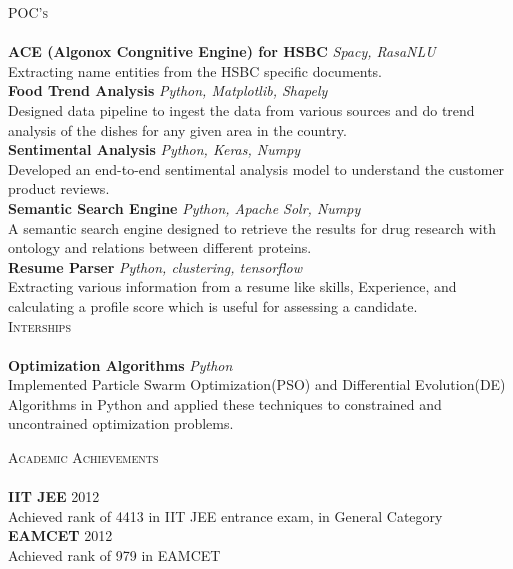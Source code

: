 \documentclass[a4paper]{article}
\newcommand{\lineunder} {
    \vspace*{-8pt} \\
    \hspace*{-18pt} \hrulefill \\
}
\newcommand{\header} [1] {
    {\hspace*{-18pt}\vspace*{6pt} \textsc{#1}}
    \vspace*{-6pt} \lineunder
}
\begin{document}
\header{POC's}
{\textbf{ACE (Algonox Congnitive Engine) for HSBC}} {\sl Spacy, RasaNLU} \\
Extracting name entities from the HSBC specific documents.\\
\vspace*{2mm}
{\textbf{Food Trend Analysis}} {\sl Python, Matplotlib, Shapely} \\
Designed data pipeline to ingest the data from various sources and do trend analysis of the dishes for
any given area in the country.\\
\vspace*{2mm}
{\textbf{Sentimental Analysis}} {\sl Python, Keras, Numpy} \\
Developed an end-to-end sentimental analysis model to understand the customer product reviews.\\
\vspace*{2mm}
{\textbf{Semantic Search Engine}} {\sl Python, Apache Solr, Numpy} \\
A semantic search engine designed to retrieve the results for drug research with ontology and relations
between different proteins.\\
\vspace*{2mm}
{\textbf{Resume Parser}} {\sl Python, clustering, tensorflow} \\
Extracting various information from a resume like skills, Experience, and calculating a profile score which is useful for assessing a candidate.\\

\header{Interships}
{\textbf{Optimization Algorithms}} {\sl Python} \\
Implemented Particle Swarm Optimization(PSO) and Differential Evolution(DE) Algorithms in Python
and applied these techniques to constrained and uncontrained optimization problems.\\
\vspace*{2mm}

\header{Academic Achievements} 
{\textbf{IIT JEE}} \hfill 2012\\
Achieved rank of 4413 in IIT JEE entrance exam, in General Category\\
\vspace*{2mm}
{\textbf{EAMCET}} \hfill 2012\\
Achieved rank of 979 in EAMCET\\
\vspace*{2mm}
\end{document}
